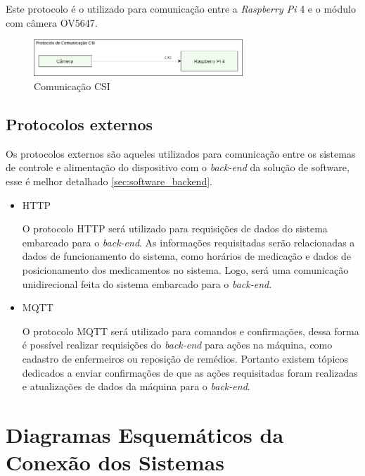 \begin{itemize}
    Este protocolo é o utilizado para comunicação entre a \textit{Raspberry Pi} 4 e o módulo com câmera OV5647.
    
\begin{figure}[H]
    \centering
    \includegraphics[width=0.7\textwidth]{figuras/eletronica/fluxogramas/comunicacao_csi.png}
    \caption{Comunicação CSI}
    \label{fig:PC_CSI}
\end{figure}
    
\end{itemize}
\subsection{Protocolos externos}

Os protocolos externos são aqueles utilizados para comunicação entre os sistemas de controle e alimentação do dispositivo com o \textit{back-end} da solução de software, esse é melhor detalhado \ref{sec:software_backend}.

\begin{itemize}
    \item HTTP
    
    O protocolo HTTP será utilizado para requisições de dados do sistema embarcado para o \textit{back-end}. As informações requisitadas serão relacionadas a dados de funcionamento do sistema, como horários de medicação e dados de posicionamento dos medicamentos no sistema. Logo, será uma comunicação unidirecional feita do sistema embarcado para o \textit{back-end}.
    
    \item MQTT
    
    O protocolo MQTT será utilizado para comandos e confirmações, dessa forma é possível realizar requisições do \textit{back-end} para ações na máquina, como cadastro de enfermeiros ou reposição de remédios. Portanto existem  tópicos dedicados a enviar confirmações de que as ações requisitadas foram realizadas e atualizações de dados da máquina para o \textit{back-end}.
    
    
\end{itemize}

\section{Diagramas Esquemáticos da Conexão dos Sistemas}\label{sec:esq_conec_sistemas}

